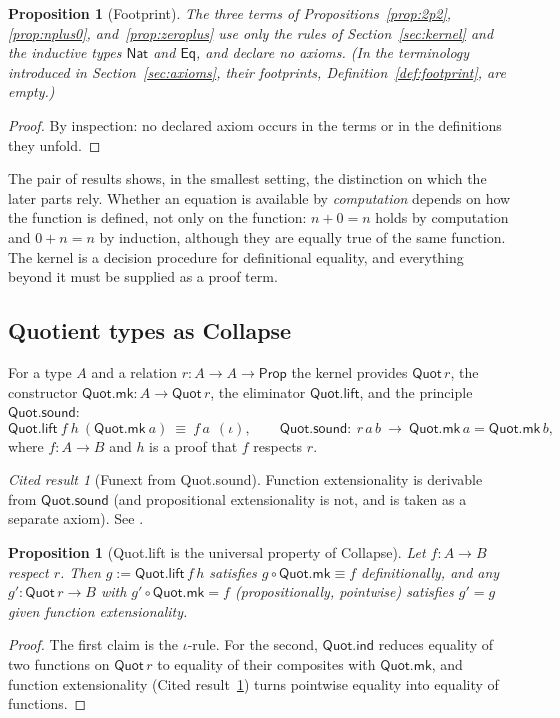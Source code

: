 \documentclass[11pt]{article}
\newcommand{\Prop}{\mathsf{Prop}}
\newcommand{\Quot}{\mathsf{Quot}}
\theoremstyle{definition}
\theoremstyle{plain}
\newtheorem{proposition}[definition]{Proposition}
\theoremstyle{remark}
\newtheorem{cited}[definition]{Cited result}
\begin{document}
\begin{proposition}[Footprint]\label{prop:nat-footprint}
The three terms of Propositions~\ref{prop:2p2}, \ref{prop:nplus0}, and~\ref{prop:zeroplus} use only the rules of Section~\ref{sec:kernel} and the inductive types $\mathsf{Nat}$ and $\mathsf{Eq}$, and declare no axioms. (In the terminology introduced in Section~\ref{sec:axioms}, their footprints, Definition~\ref{def:footprint}, are empty.)
\end{proposition}
\begin{proof}
By inspection: no declared axiom occurs in the terms or in the definitions they unfold.
\end{proof}

The pair of results shows, in the smallest setting, the distinction on which the later parts rely. Whether an equation is available by \emph{computation} depends on how the function is defined, not only on the function: $n+0=n$ holds by computation and $0+n=n$ by induction, although they are equally true of the same function. The kernel is a decision procedure for definitional equality, and everything beyond it must be supplied as a proof term.

\subsection{Quotient types as Collapse}\label{sec:quot}

For a type $A$ and a relation $r:A\to A\to\Prop$ the kernel provides $\Quot\,r$, the constructor $\Quot.\mathsf{mk}:A\to\Quot\,r$, the eliminator $\Quot.\mathsf{lift}$, and the principle $\Quot.\mathsf{sound}$:
\[
\Quot.\mathsf{lift}\ f\ h\ (\Quot.\mathsf{mk}\ a)\ \equiv\ f\,a\ \ (\iota),\qquad
\Quot.\mathsf{sound}:\ r\,a\,b\ \to\ \Quot.\mathsf{mk}\,a=\Quot.\mathsf{mk}\,b,
\]
where $f:A\to B$ and $h$ is a proof that $f$ respects $r$.

\begin{cited}[Funext from Quot.sound]\label{cit:funext}
Function extensionality is derivable from $\Quot.\mathsf{sound}$ (and propositional extensionality is not, and is taken as a separate axiom). See \cite{Carneiro19}.
\end{cited}

\begin{proposition}[Quot.lift is the universal property of Collapse]\label{prop:quotuniv}
Let $f:A\to B$ respect $r$. Then $g:=\Quot.\mathsf{lift}\,f\,h$ satisfies $g\circ\Quot.\mathsf{mk}\equiv f$ definitionally, and any $g':\Quot\,r\to B$ with $g'\circ\Quot.\mathsf{mk}=f$ (propositionally, pointwise) satisfies $g'=g$ given function extensionality.
\end{proposition}
\begin{proof}
The first claim is the $\iota$-rule. For the second, $\Quot.\mathsf{ind}$ reduces equality of two functions on $\Quot\,r$ to equality of their composites with $\Quot.\mathsf{mk}$, and function extensionality (Cited result~\ref{cit:funext}) turns pointwise equality into equality of functions.
\end{proof}
\end{document}
